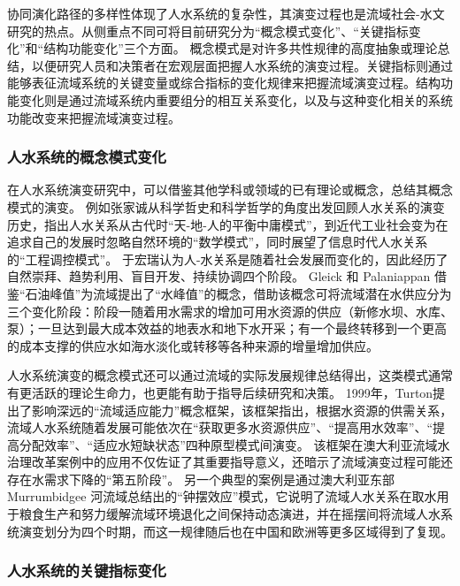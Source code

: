 协同演化路径的多样性体现了人水系统的复杂性，其演变过程也是流域社会-水文研究的热点。从侧重点不同可将目前研究分为“概念模式变化”、“关键指标变化”和“结构功能变化”三个方面。
概念模式是对许多共性规律的高度抽象或理论总结，以便研究人员和决策者在宏观层面把握人水系统的演变过程。关键指标则通过能够表征流域系统的关键变量或综合指标的变化规律来把握流域演变过程。结构功能变化则是通过流域系统内重要组分的相互关系变化，以及与这种变化相关的系统功能改变来把握流域演变过程。

\subsubsection{人水系统的概念模式变化}

在人水系统演变研究中，可以借鉴其他学科或领域的已有理论或概念，总结其概念模式的演变。
例如张家诚从科学哲史和科学哲学的角度出发回顾人水关系的演变历史，指出人水关系从古代时“天-地-人的平衡中庸模式”，到近代工业社会变为在追求自己的发展时忽略自然环境的“数学模式”，同时展望了信息时代人水关系的“工程调控模式”\cite{zhang2006}。
于宏瑞认为人-水关系是随着社会发展而变化的，因此经历了自然崇拜、趋势利用、盲目开发、持续协调四个阶段\cite{yuruihong2011}。
Gleick 和 Palaniappan 借鉴“石油峰值”为流域提出了“水峰值”的概念，借助该概念可将流域潜在水供应分为三个变化阶段：阶段一随着用水需求的增加可用水资源的供应（新修水坝、水库、泵）；一旦达到最大成本效益的地表水和地下水开采；有一个最终转移到一个更高的成本支撑的供应水如海水淡化或转移等各种来源的增量增加供应\cite{gleick2010}。

人水系统演变的概念模式还可以通过流域的实际发展规律总结得出，这类模式通常有更活跃的理论生命力，也更能有助于指导后续研究和决策。
1999年，Turton提出了影响深远的“流域适应能力”概念框架，该框架指出，根据水资源的供需关系，流域人水系统随着发展可能依次在“获取更多水资源供应”、“提高用水效率”、“提高分配效率”、“适应水短缺状态”四种原型模式间演变\cite{turton1999}。
该框架在澳大利亚流域水治理改革案例中的应用不仅佐证了其重要指导意义，还暗示了流域演变过程可能还存在水需求下降的“第五阶段”\cite{loch2020}。
另一个典型的案例是通过澳大利亚东部 Murrumbidgee 河流域总结出的“钟摆效应”模式，它说明了流域人水关系在取水用于粮食生产和努力缓解流域环境退化之间保持动态演进，并在摇摆间将流域人水系统演变划分为四个时期\cite{kandasamy2014, roobavannan2017}，而这一规律随后也在中国和欧洲等更多区域得到了复现\cite{han2017, mostert2018}。

\subsubsection{人水系统的关键指标变化}

